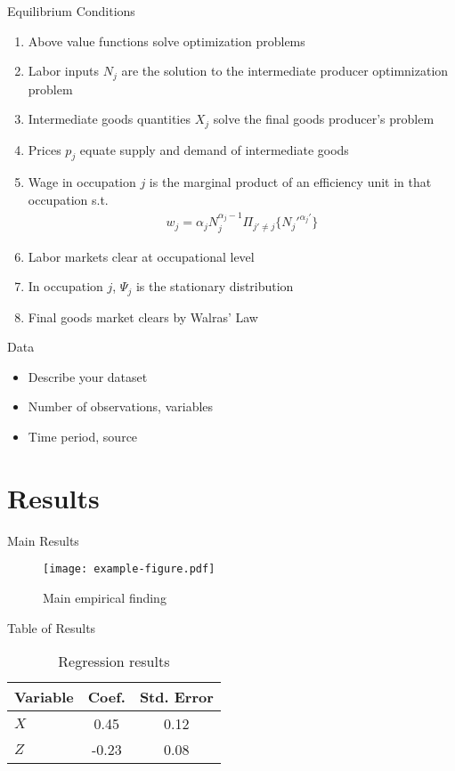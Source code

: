 \documentclass{beamer}
\begin{document}
\begin{frame}{Equilibrium Conditions}
  \begin{enumerate}
    \item Above value functions solve optimization problems
    \item Labor inputs $N_j$ are the solution to the intermediate producer optimnization problem
    \item Intermediate goods quantities $X_j$ solve the final goods producer's problem
    \item Prices $p_j$ equate supply and demand of intermediate goods
    \item Wage in occupation $j$ is the marginal product of an efficiency unit in that occupation s.t.
    \begin{gather*}
      w_j = \alpha_j N^{\alpha_j-1}_j \Pi_{j'\ne j}\{N_j'^{\alpha_j'}\}
    \end{gather*}
    \item Labor markets clear at occupational level
    \item In occupation $j$, $\Psi_j$ is the stationary distribution
    \item Final goods market clears by Walras' Law
  \end{enumerate}
\end{frame}



\begin{frame}{Data}
  \begin{itemize}
    \item Describe your dataset
    \item Number of observations, variables
    \item Time period, source
  \end{itemize}
\end{frame}


\section{Results}

\begin{frame}{Main Results}
  \begin{figure}
    \centering
    \texttt{[image: example-figure.pdf]}
    \caption{Main empirical finding}
  \end{figure}
\end{frame}

\begin{frame}{Table of Results}
  \begin{table}
    \centering
    \begin{tabular}{lcc}
      \toprule
      Variable & Coef. & Std. Error \\
      \midrule
      $X$ & 0.45 & 0.12 \\
      $Z$ & -0.23 & 0.08 \\
      \bottomrule
    \end{tabular}
    \caption{Regression results}
  \end{table}
\end{frame}
\end{document}
